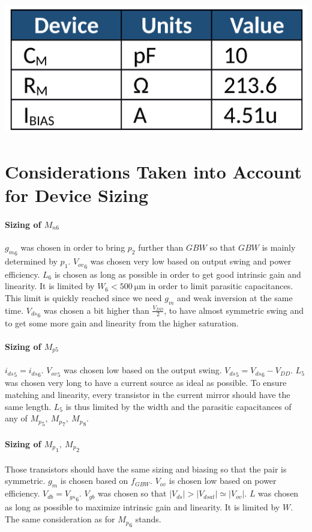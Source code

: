 \documentclass[english,10pt]{article}
\begin{document}
\begin{center}
\includegraphics[width = .3\textwidth]{page2_table1.png}
\end{center}
\setcounter{section}{4}
\setcounter{page}{2}
\section{Considerations Taken into Account for Device Sizing}

\paragraph{Sizing of $M_{n6}$}
${g_m}_{6}$ was chosen in order to bring $p_{2}$ further than $GBW$ so that $GBW$ is mainly determined by $p_1$.
${V_{ov}}_{6}$ was chosen very low based on output swing and power efficiency.
$L_{6}$ is chosen as long as possible in order to get good intrinsic gain and linearity. It is limited by $W_{6} < \SI{500}{\micro\meter}$ in order to limit parasitic capacitances. This limit is quickly reached since we need $g_m$ and weak inversion at the same time.
${V_{ds}}_6$ was chosen a bit higher than $\frac{V_{DD}}{2}$, to have almost symmetric swing and to get some more gain and linearity from the higher saturation.

\paragraph{Sizing of $M_{p5}$}
${i_{ds}}_5 = {i_{ds}}_6$.
${V_{ov}}_5$ was chosen low based on the output swing.
${V_{ds}}_5 = {V_{ds}}_6 - V_{DD}$.
$L_{5}$ was chosen very long to have a current source as ideal as possible. To ensure matching and linearity, every transistor in the current mirror should have the same length. $L_{5}$ is thus limited by the width and the parasitic capacitances of any of ${M_p}_{5}, \: {M_p}_{7}, \: {M_p}_{8}$.

\paragraph{Sizing of ${M_p}_{1},\:{M_p}_2$}
Those transistors should have the same sizing and biasing so that the pair is symmetric.
${g_m}$ is chosen based on $f_{GBW}$.
$V_{ov}$ is chosen low based on power efficiency.
${V_{db}} = {V_{gs}}_6$.
$V_{gb}$ was chosen so that $|V_{ds}| > |V_{dsat}| \simeq |V_{ov}|$.
$L$ was chosen as long as possible to maximize intrinsic gain and linearity. It is limited by $W$. The same consideration as for ${M_p}_6$ stands.
\end{document}
